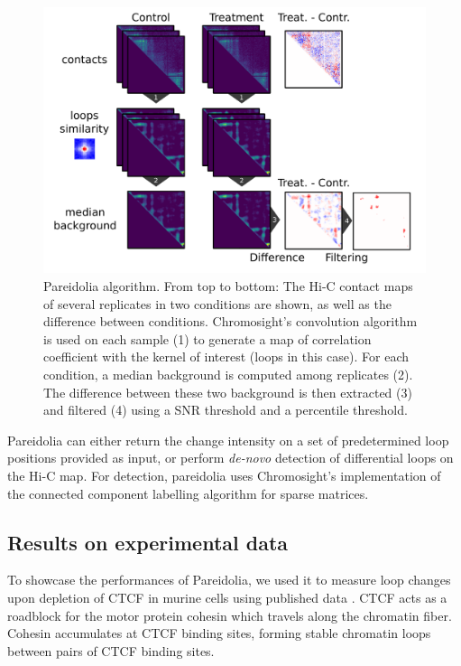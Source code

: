 \begin{figure}[htb]
    \includegraphics[width=\textwidth]{Parts/Part02/gfx/pareidolia_process.pdf}
    \caption[Pareidolia algorithm.]{Pareidolia algorithm. From top to bottom: The Hi-C contact maps of several replicates in two conditions are shown, as well as the difference between conditions. Chromosight's convolution algorithm is used on each sample (1) to generate a map of correlation coefficient with the kernel of interest (loops in this case). For each condition, a median background is computed among replicates (2). The difference between these two background is then extracted (3) and filtered (4) using a \acrshort{SNR} threshold and a percentile threshold.}
    \label{fig:02-01:pareidolia}
\end{figure}

Pareidolia can either return the change intensity on a set of predetermined loop positions provided as input, or perform \textit{de-novo} detection of differential loops on the Hi-C map. For detection, pareidolia uses Chromosight's implementation of the connected component labelling algorithm for sparse matrices.

\subsection{Results on experimental data}

To showcase the performances of Pareidolia, we used it to measure loop changes upon depletion of CTCF in murine cells using published data \cite{noraTargetedDegradationCTCF2017}. CTCF acts as a roadblock for the motor protein cohesin which travels along the chromatin fiber. Cohesin accumulates at CTCF binding sites, forming stable chromatin loops between pairs of CTCF binding sites.

